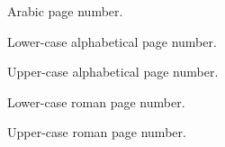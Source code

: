 \documentclass[11pt, english]{article}
\begin{document}

	Arabic page number.

\newpage


	Lower-case alphabetical page number.

\newpage 


	Upper-case alphabetical page number.

\newpage


	Lower-case roman page number.

\newpage


	Upper-case roman page number.
\end{document}
